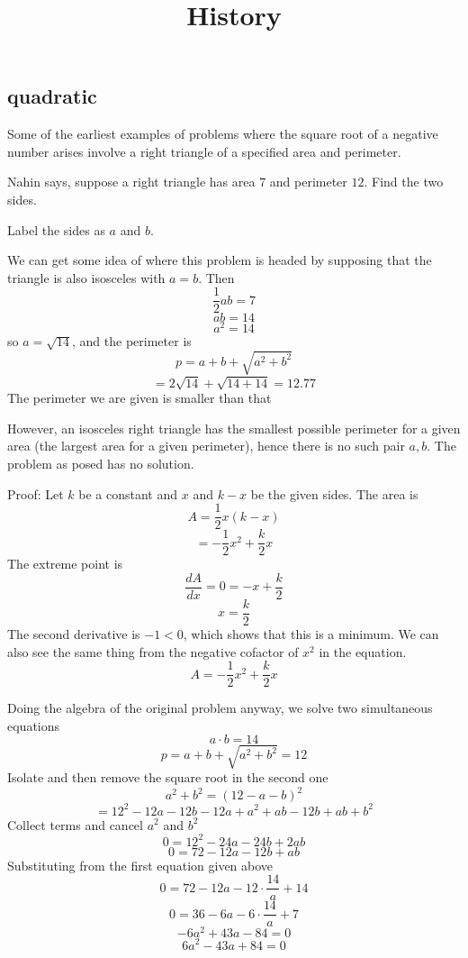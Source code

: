 \documentclass[11pt, oneside]{article}
\title{History}
\date{}
\begin{document}
\maketitle
\Large

\subsection*{quadratic}

Some of the earliest examples of problems where the square root of a negative number arises involve a right triangle of a specified area and perimeter.  

Nahin says, suppose a right triangle has area $7$ and perimeter $12$.  Find the two sides.  

Label the sides as $a$ and $b$.

We can get some idea of where this problem is headed by supposing that the triangle is also isosceles with $a = b$.  Then 
\[ \frac{1}{2} ab = 7 \]
\[ ab = 14 \]
\[ a^2 = 14 \] 
so $a = \sqrt{14}$, and the perimeter is
\[ p = a + b + \sqrt{a^2 + b^2} \]
\[ = 2 \sqrt{14} + \sqrt{14 + 14} = 12.77 \]
The perimeter we are given is smaller than that

However, an isosceles right triangle has the smallest possible perimeter for a given area (the largest area for a given perimeter), hence there is no such pair $a,b$.
The problem as posed has no solution.

Proof:
Let $k$ be a constant and $x$ and $k - x$ be the given sides.  The area is
\[ A = \frac{1}{2} x (k - x) \]
\[ = -\frac{1}{2} x^2 + \frac{k}{2} x \]
The extreme point is
\[ \frac{dA}{dx} = 0 = - x + \frac{k}{2} \]
\[ x = \frac{k}{2} \]
The second derivative is $-1 < 0$, which shows that this is a minimum.  We can also see the same thing from the negative cofactor of $x^2$ in the equation.
\[ A = -\frac{1}{2} x^2 + \frac{k}{2} x \]

Doing the algebra of the original problem anyway, we solve two simultaneous equations
\[ a \cdot b = 14 \]
\[ p = a + b + \sqrt{a^2 + b^2} = 12 \]
Isolate and then remove the square root in the second one
\[ a^2 + b^2 = (12 - a - b)^2 \]
\[ = 12^2 - 12a - 12b - 12a + a^2 + ab - 12b + ab + b^2 \]
Collect terms and cancel $a^2$ and $b^2$
\[ 0 = 12^2 - 24a - 24b + 2ab \]
\[ 0 = 72 - 12a - 12b + ab \]
Substituting from the first equation given above
\[ 0 = 72 - 12a - 12 \cdot \frac{14}{a} + 14 \]
\[ 0 = 36 - 6a - 6 \cdot \frac{14}{a} + 7 \]
\[ -6 a^2 + 43a - 84 = 0 \]
\[ 6 a^2 - 43a + 84 = 0 \]
\end{document}
